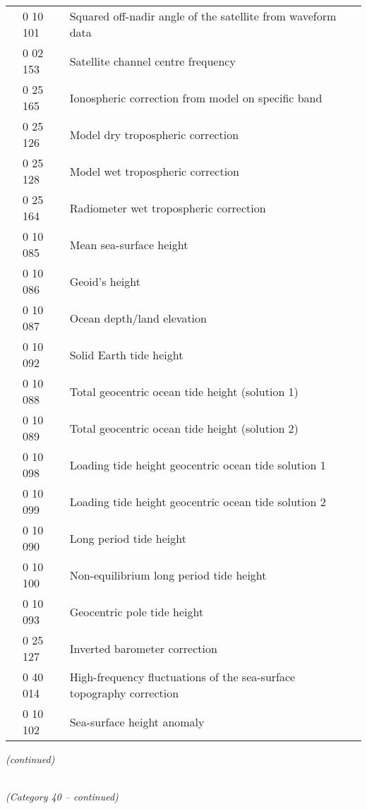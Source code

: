 \begin{longtable}[]{@{}llll@{}}
& 0 10 101 & Squared off-nadir angle of the satellite from waveform data &\tabularnewline
& 0 02 153 & Satellite channel centre frequency &\tabularnewline
& 0 25 165 & Ionospheric correction from model on specific band &\tabularnewline
& 0 25 126 & Model dry tropospheric correction &\tabularnewline
& 0 25 128 & Model wet tropospheric correction &\tabularnewline
& 0 25 164 & Radiometer wet tropospheric correction &\tabularnewline
& 0 10 085 & Mean sea-surface height &\tabularnewline
& 0 10 086 & Geoid's height &\tabularnewline
& 0 10 087 & Ocean depth/land elevation &\tabularnewline
& 0 10 092 & Solid Earth tide height &\tabularnewline
& 0 10 088 & Total geocentric ocean tide height (solution 1) &\tabularnewline
& 0 10 089 & Total geocentric ocean tide height (solution 2) &\tabularnewline
& 0 10 098 & Loading tide height geocentric ocean tide solution 1 &\tabularnewline
& 0 10 099 & Loading tide height geocentric ocean tide solution 2 &\tabularnewline
& 0 10 090 & Long period tide height &\tabularnewline
& 0 10 100 & Non-equilibrium long period tide height &\tabularnewline
& 0 10 093 & Geocentric pole tide height &\tabularnewline
& 0 25 127 & Inverted barometer correction &\tabularnewline
& 0 40 014 & High-frequency fluctuations of the sea-surface topography correction &\tabularnewline
& 0 10 102 & Sea-surface height anomaly &\tabularnewline
\bottomrule
\end{longtable}

\emph{(continued)}

\emph{\\
(Category 40 -- continued)}

